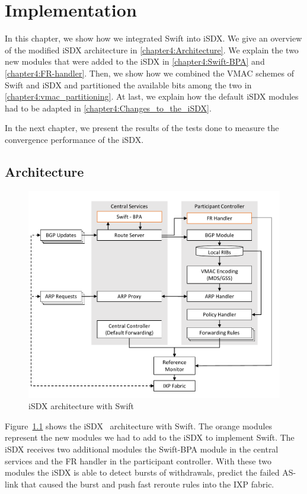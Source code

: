 \chapter{\label{chapter4}Implementation}

In this chapter, we show how we integrated Swift into iSDX. We give an overview of the modified iSDX architecture in \ref{chapter4:Architecture}. We explain the two new modules that were added to the iSDX in \ref{chapter4:Swift-BPA} and  \ref{chapter4:FR-handler}. Then, we show how we combined the VMAC schemes of Swift and iSDX and partitioned the available bits among the two in \ref{chapter4:vmac_partitioning}. At last, we explain how the default iSDX modules had to be adapted in \ref{chapter4:Changes_to_the_iSDX}.

In the next chapter, we present the results of the tests done to measure the convergence performance of the iSDX.

\section{\label{chapter4:Architecture}Architecture}

\begin{figure}[h]
\center
\includegraphics[scale = 0.5]{Figures/design_sdx_swift_cropped.pdf}
\caption{iSDX architecture with Swift}
\label{fig:isdx_architecture_with_swift}
\end{figure}

Figure~\ref{fig:isdx_architecture_with_swift} shows the iSDX~\cite{feamster2013sdx} architecture with Swift. The orange modules represent the new modules we had to add to the iSDX to implement Swift. The iSDX receives two additional modules the Swift-BPA module in the central services and the FR handler in the participant controller. With these two modules the iSDX is able to detect bursts of withdrawals, predict the failed AS-link that caused the burst and push fast reroute rules into the IXP fabric.

